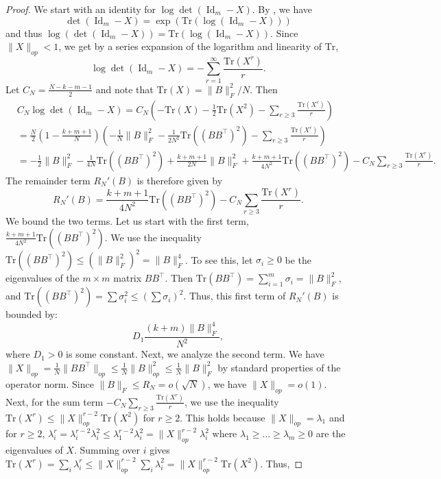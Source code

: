 \documentclass[11pt,a4paper,twoside]{article}
\theoremstyle{definition}
\begin{document}
\begin{proof}
	We start with an identity for $\log\det(\operatorname{Id}_m - X)$. By \cite[Equation (512)]{petersen2008matrix}, we have 
  $$
  \det(\operatorname{Id}_m - X) = \exp(\mathrm{Tr}(\log(\operatorname{Id}_m -X)))
  $$ 
  and thus $\log(\det(\operatorname{Id}_m - X)) = \mathrm{Tr}(\log(\operatorname{Id}_m - X))$. Since $\|X\|_{op}<1$, we get by a series expansion of the logarithm and linearity of $\mathrm{Tr}$,
	$$ \log\det(\operatorname{Id}_m - X) = -\sum_{r=1}^\infty\frac{\mathrm{Tr}(X^r)}{r}. $$
	Let \(C_N = \frac{N-k-m-1}{2}\) and note that $\mathrm{Tr}(X) = \|B\|_F^2/N$. Then
	\begin{align*} 
    &C_N \log\det(\operatorname{Id}_m-X) = C_N \left(-\mathrm{Tr}(X) - \frac12\mathrm{Tr}(X^2) - \sum_{r\ge3}\frac{\mathrm{Tr}(X^r)}{r}\right) \\
	&= \frac{N}{2}(1-\frac{k+m+1}{N}) \left(-\frac{1}{N}\|B\|_F^2 - \frac{1}{2N^2}\mathrm{Tr}((BB^\top)^2) - \sum_{r\ge3}\frac{\mathrm{Tr}(X^r)}{r}\right) \\
	&= -\frac12\|B\|_F^2 - \frac{1}{4N}\mathrm{Tr}((BB^\top)^2) + \frac{k+m+1}{2N}\|B\|_F^2 + \frac{k+m+1}{4N^2}\mathrm{Tr}((BB^\top)^2)- C_N \sum_{r\ge3}\frac{\mathrm{Tr}(X^r)}{r}.
	\end{align*}
	The remainder term \(R_N'(B)\) is therefore given by
	\[ R_N'(B) = \frac{k+m+1}{4N^2}\mathrm{Tr}((BB^\top)^2) - C_N \sum_{r\ge3}\frac{\mathrm{Tr}(X^r)}{r}. \]
	We bound the two terms. Let us start with the first term, \(\frac{k+m+1}{4N^2}\mathrm{Tr}((BB^\top)^2)\). We use the inequality \(\mathrm{Tr}((BB^\top)^2) \le (\|B\|_F^2)^2 = \|B\|_F^4\). To see this, let \(\sigma_i \ge 0\) be the eigenvalues of the \(m \times m\) matrix \(BB^\top\). Then \(\mathrm{Tr}(BB^\top) = \sum_{i=1}^m \sigma_i = \|B\|_F^2\), and \(\mathrm{Tr}((BB^\top)^2) = \sum \sigma_i^2\le (\sum \sigma_i)^2\). Thus, this first term of \(R_N'(B)\) is bounded by:
	$$ D_1 \frac{(k+m)\|B\|_F^4}{N^2}, $$
	where $D_1>0$ is some constant. Next, we analyze the second term. We have $\|X\|_{op} = \frac{1}{N}\|BB^\top\|_{op} \le \frac{1}{N}\|B\|_{op}^2 \le \frac{1}{N}\|B\|_F^2$ by standard properties of the operator norm. Since $\|B\|_F \le R_N = o(\sqrt{N})$, we have $\|X\|_{op} = o(1)$. Next, for the sum term \(-C_N \sum_{r\ge3}\frac{\mathrm{Tr}(X^r)}{r}\), we use the inequality \(\mathrm{Tr}(X^r) \le \|X\|_{op}^{r-2}\mathrm{Tr}(X^2)\) for \(r \ge 2\). This holds because $\|X\|_{op} = \lambda_1$ and for \(r \ge 2\), \(\lambda_i^r = \lambda_i^{r-2}\lambda_i^2 \le \lambda_1^{r-2}\lambda_i^2 = \|X\|_{op}^{r-2}\lambda_i^2\) where $\lambda_1\ge \ldots\ge\lambda_m \ge 0$ are the eigenvalues of $X$. Summing over \(i\) gives \(\mathrm{Tr}(X^r) = \sum_i \lambda_i^r \le \|X\|_{op}^{r-2} \sum_i \lambda_i^2 = \|X\|_{op}^{r-2}\mathrm{Tr}(X^2)\). Thus,

\end{proof}
\end{document}
